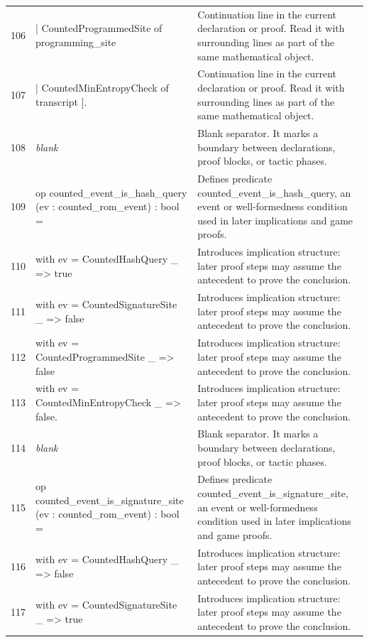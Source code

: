 \documentclass[10pt]{article}
\begin{document}
\begin{longtable}{r L{0.53\textwidth} L{0.37\textwidth}}
106 & {\ttfamily\scriptsize   | CountedProgrammedSite of programming\_site} & Continuation line in the current declaration or proof.  Read it with surrounding lines as part of the same mathematical object. \\
107 & {\ttfamily\scriptsize   | CountedMinEntropyCheck of transcript ].} & Continuation line in the current declaration or proof.  Read it with surrounding lines as part of the same mathematical object. \\
108 & {\ttfamily\scriptsize \emph{blank}} & Blank separator.  It marks a boundary between declarations, proof blocks, or tactic phases. \\
109 & {\ttfamily\scriptsize op counted\_event\_is\_hash\_query (ev : counted\_rom\_event) : bool =} & Defines predicate counted\_event\_is\_hash\_query, an event or well-formedness condition used in later implications and game proofs. \\
110 & {\ttfamily\scriptsize   with ev = CountedHashQuery \_ => true} & Introduces implication structure: later proof steps may assume the antecedent to prove the conclusion. \\
111 & {\ttfamily\scriptsize   with ev = CountedSignatureSite \_ => false} & Introduces implication structure: later proof steps may assume the antecedent to prove the conclusion. \\
112 & {\ttfamily\scriptsize   with ev = CountedProgrammedSite \_ => false} & Introduces implication structure: later proof steps may assume the antecedent to prove the conclusion. \\
113 & {\ttfamily\scriptsize   with ev = CountedMinEntropyCheck \_ => false.} & Introduces implication structure: later proof steps may assume the antecedent to prove the conclusion. \\
114 & {\ttfamily\scriptsize \emph{blank}} & Blank separator.  It marks a boundary between declarations, proof blocks, or tactic phases. \\
115 & {\ttfamily\scriptsize op counted\_event\_is\_signature\_site (ev : counted\_rom\_event) : bool =} & Defines predicate counted\_event\_is\_signature\_site, an event or well-formedness condition used in later implications and game proofs. \\
116 & {\ttfamily\scriptsize   with ev = CountedHashQuery \_ => false} & Introduces implication structure: later proof steps may assume the antecedent to prove the conclusion. \\
117 & {\ttfamily\scriptsize   with ev = CountedSignatureSite \_ => true} & Introduces implication structure: later proof steps may assume the antecedent to prove the conclusion. \\

\end{longtable}
\end{document}
